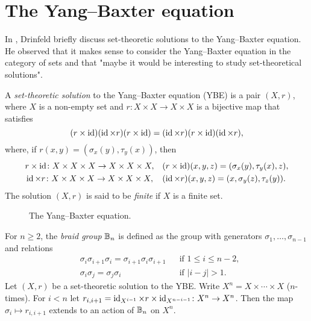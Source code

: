 \chapter{The Yang--Baxter equation}
\label{YB}


In \cite{MR1183474}, Drinfeld briefly discuss set-theoretic solutions to the Yang--Baxter equation. 
He observed that
it makes sense to consider the Yang--Baxter equation in the category of sets and that 
"maybe it would be interesting to study set-theoretical solutions". 

\begin{definition}
A \emph{set-theoretic solution} to the Yang--Baxter equation (YBE) is a pair $(X,r)$, 
where $X$ is a non-empty set and $r\colon X\times X\to X\times X$ is a bijective map that satisfies 
\[
(r\times\operatorname{id})(\operatorname{id}\times r)(r\times\operatorname{id})=
(\operatorname{id}\times r)(r\times\operatorname{id})(\operatorname{id}\times r),
\]
where, if $r(x,y)=(\sigma_x(y),\tau_y(x))$, then 
\begin{align*}
& r\times\operatorname{id}\colon X\times X\times X\to X\times X\times X, &&(r\times\operatorname{id})(x,y,z)=(\sigma_x(y),\tau_y(x),z),\\
& \operatorname{id}\times r\colon X\times X\times X\to X\times X\times X, &&(\operatorname{id}\times r)(x,y,z)=(x,\sigma_y(z),\tau_z(y)).
\end{align*}
The solution $(X,r)$ is said to be \emph{finite} if $X$ is a finite set. 
\end{definition}

\begin{figure}
\centering
{}
\hspace{1cm}
\caption{The Yang--Baxter equation.}
\label{fig:braid}
\end{figure}

For $n\geq2$, the \emph{braid group} $\mathbb{B}_n$ is defined as the group with generators $\sigma_1,\dots,\sigma_{n-1}$ and relations
\begin{align*}
    &\sigma_i\sigma_{i+1}\sigma_i=\sigma_{i+1}\sigma_i\sigma_{i+1} && \text{if }1\leq i\leq n-2,\\
    &\sigma_i\sigma_j=\sigma_j\sigma_i && \text{if }|i-j|> 1.
\end{align*}
Let $(X,r)$ be a set-theoretic solution to the YBE. Write $X^n=X\times\cdots\times X$ ($n$-times).  
For $i<n$ let 
$r_{i,i+1}=\operatorname{id}_{X^{i-1}}\times r\times\operatorname{id}_{X^{n-i-1}}\colon X^n\to X^n$.
Then the map $\sigma_i\mapsto r_{i,i+1}$ extends 
to an action of $\mathbb{B}_n$ on $X^n$.

